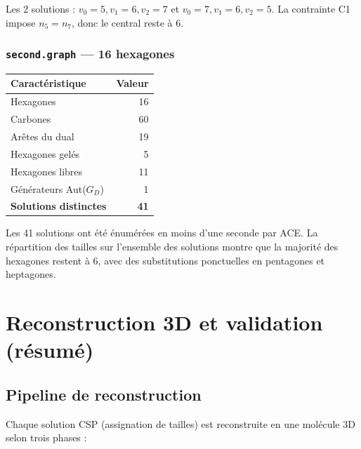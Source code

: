 \documentclass[12pt,a4paper]{article}
\theoremstyle{definition}
\newcommand{\GD}{G_{\!D}}
\begin{document}
Les 2 solutions : $v_0 = 5, v_1 = 6, v_2 = 7$ et $v_0 = 7, v_1 = 6, v_2 = 5$.
La contrainte C1 impose $n_5 = n_7$, donc le central reste à 6.

\subsubsection{\texttt{second.graph} — 16 hexagones}

\begin{center}
\begin{tabular}{lr}
  \toprule
  Caractéristique & Valeur \\
  \midrule
  Hexagones & 16 \\
  Carbones & 60 \\
  Arêtes du dual & 19 \\
  Hexagones gelés & 5 \\
  Hexagones libres & 11 \\
  Générateurs Aut($\GD$) & 1 \\
  \textbf{Solutions distinctes} & \textbf{41} \\
  \bottomrule
\end{tabular}
\end{center}

Les 41 solutions ont été énumérées en moins d'une seconde par ACE. La répartition des
tailles sur l'ensemble des solutions montre que la majorité des hexagones restent à 6, avec
des substitutions ponctuelles en pentagones et heptagones.

\section{Reconstruction 3D et validation (résumé)}

\subsection{Pipeline de reconstruction}

Chaque solution CSP (assignation de tailles) est reconstruite en une molécule 3D selon
trois phases :
\end{document}
